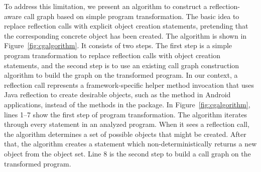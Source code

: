 

To address this limitation, we present an algorithm to construct
a reflection-aware call graph based on simple program transformation.
The basic idea to replace reflection calls with explicit object
creation statements, pretending that the corresponding concrete object
has been created.  The algorithm is shown in Figure~\ref{fig:cgalgorithm}.
It consists of two steps. The first step is a simple program
transformation to replace reflection calls with object creation statements, and
the second step is to use an existing call graph construction algorithm
to build the graph on the transformed program. In our context,
a reflection call represents a framework-specific helper method invocation
that uses Java reflection to create desirable objects, such as
the  method in Android applications, instead
of the methods in the  package.
In Figure~\ref{fig:cgalgorithm}, lines 1--7 show
the first step of program transformation. The algorithm iterates through every statement
in an analyzed program. When it sees a reflection call, the algorithm
determines a set of possible objects that might be created.
After that, the algorithm creates a statement which non-deterministically
returns a new object from the object set. Line 8 is the second step
to build a call graph on the transformed program. 

